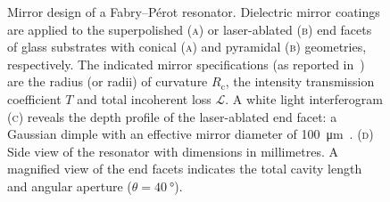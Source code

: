 \documentclass[../Thesis-IJspeert.tex]{subfiles}
\begin{document}
\begin{figure}[t]
	\caption[Mirror design of a Fabry--Pérot resonator]{Mirror design of a Fabry--Pérot resonator. Dielectric mirror coatings are applied to the superpolished \textsc{(a)} or laser-ablated \textsc{(b)} end facets of glass substrates with conical \textsc{(a)} and pyramidal \textsc{(b)} geometries, respectively. The indicated mirror specifications (as reported in~\cite{doherty2021a}) are the radius (or radii) of curvature $R_\mathrm{c}$, the intensity transmission coefficient $T$ and total incoherent loss $\mathcal{L}$. A white light interferogram \textsc{(c)} reveals the depth profile of the laser-ablated end facet: a Gaussian dimple with an effective mirror diameter of \SI{100}{\micro\meter}~\cite{doherty2021a}. \textsc{(d)} Side view of the resonator with dimensions in millimetres. A magnified view of the end facets indicates the total cavity length and angular aperture ($\theta=\SI{40}{\degree}$).}
	\label{resonatordesign} 
\end{figure}
\end{document}
